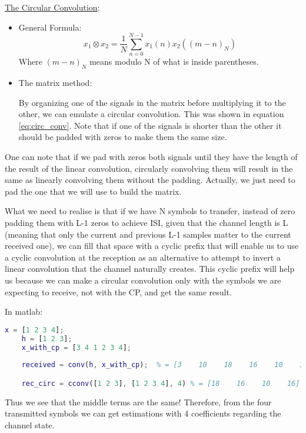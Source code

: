 \documentclass[12pt, a4paper]{article}
\begin{document}
\uline{The Circular Convolution}:
\begin{itemize}
    \item General Formula:
    \begin{equation}
        x_1 \otimes x_2 = \frac{1}{N} \sum_{n=0}^{N-1}x_1(n) x_2((m-n)_N)
    \end{equation}
    Where $(m-n)_N$ means modulo N of what is inside parentheses.
    \item The matrix method:
    
    By organizing one of the signals in the matrix before multiplying it to the other, we can emulate a circular convolution. This was shown in equation \ref{eq:circ_conv}. Note that if one of the signals is shorter than the other it should be padded with zeros to make them the same size.
\end{itemize}


One can note that if we pad with zeros both signals until they have the length of the result of the linear convolution, circularly convolving them will result in the same as linearly convolving them without the padding. Actually, we just need to pad the one that we will use to build the matrix.

What we need to realise is that if we have N symbols to transfer, instead of zero padding them with L-1 zeros to achieve ISI, given that the channel length is L (meaning that only the current and previous L-1 samples matter to the current received one), we can fill that space with a cyclic prefix that will enable us to use a cyclic convolution at the reception as an alternative to attempt to invert a linear convolution that the channel naturally creates. 
This cyclic prefix will help us because we can make a circular convolution only with the symbols we are expecting to receive, not with the CP, and get the same result.

In matlab:
\begin{lstlisting}[language=Matlab]
    x = [1 2 3 4];
    h = [1 2 3];
    x_with_cp = [3 4 1 2 3 4];
    
    received = conv(h, x_with_cp);  % = [3    10    18    16    10    16    17    12]

    rec_circ = cconv([1 2 3], [1 2 3 4], 4) % = [18    16    10    16]

\end{lstlisting}

Thus we see that the middle terms are the same! Therefore, from the four transmitted symbols we can get estimations with 4 coefficients regarding the channel state.
\end{document}
